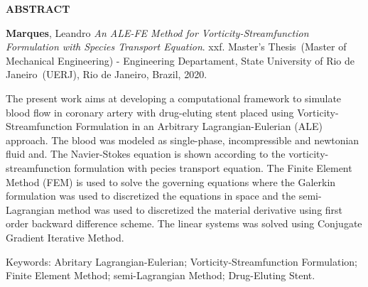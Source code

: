 \begin{center}
\textbf{ABSTRACT}
\end{center}


$\!$\\

\hspace{-1.3cm}\textbf{Marques}, Leandro \textit{An ALE-FE Method for Vorticity-Streamfunction Formulation with Species Transport Equation}. xxf. Master's Thesis~(Master of Mechanical Engineering) - Engineering Departament, State University of Rio de Janeiro~(UERJ), Rio de Janeiro, Brazil, 2020.

\vspace{.2cm}

\indent The present work aims at developing a computational framework to simulate blood flow in coronary artery with
drug-eluting stent placed using Vorticity-Streamfunction Formulation in an Arbitrary Lagrangian-Eulerian (ALE) approach.
The blood was modeled as single-phase, incompressible and newtonian fluid and. The Navier-Stokes equation is shown according to the vorticity-streamfunction formulation with pecies transport equation.
The Finite Element Method (FEM) is used to solve the governing equations where the Galerkin formulation was used
to discretized the equations in space and the semi-Lagrangian method was used to discretized the material derivative
using first order backward difference scheme. The linear systems was solved using Conjugate Gradient Iterative Method.

\vspace{1cm}

\hspace{-1.3cm}Keywords: Abritary Lagrangian-Eulerian; Vorticity-Streamfunction Formulation; Finite Element Method; semi-Lagrangian Method; Drug-Eluting Stent.
